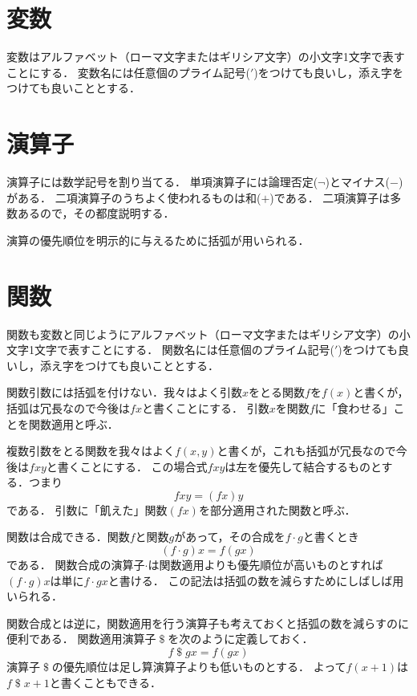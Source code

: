 \documentclass[twocolumn]{jsbook}
\newcommand{\dollar}{\mathop{\$}}
\begin{document}
\section{変数}

変数はアルファベット（ローマ文字またはギリシア文字）の小文字1文字で表すことにする．
変数名には任意個のプライム記号($'$)をつけても良いし，添え字をつけても良いこととする．

\section{演算子}

演算子には数学記号を割り当てる．
単項演算子には論理否定($\neg$)とマイナス($-$)がある．
二項演算子のうちよく使われるものは和($+$)である．
二項演算子は多数あるので，その都度説明する．

演算の優先順位を明示的に与えるために括弧が用いられる．

\section{関数}

関数も変数と同じようにアルファベット（ローマ文字またはギリシア文字）の小文字1文字で表すことにする．
関数名には任意個のプライム記号($'$)をつけても良いし，添え字をつけても良いこととする．

関数引数には括弧を付けない．我々はよく引数$x$をとる関数$f$を$f(x)$と書くが，括弧は冗長なので今後は$fx$と書くことにする．
引数$x$を関数$f$に「食わせる」ことを関数適用と呼ぶ．

複数引数をとる関数を我々はよく$f(x,y)$と書くが，これも括弧が冗長なので今後は$fxy$と書くことにする．
この場合式$fxy$は左を優先して結合するものとする．つまり$$fxy=(fx)y$$である．
引数に「飢えた」関数$(fx)$を部分適用された関数と呼ぶ．

関数は合成できる．関数$f$と関数$g$があって，その合成を$f\cdot g$と書くとき$$(f\cdot g)x=f(gx)$$である．
関数合成の演算子$\cdot$は関数適用よりも優先順位が高いものとすれば$(f\cdot g)x$は単に$f\cdot gx$と書ける．
この記法は括弧の数を減らすためにしばしば用いられる．

関数合成とは逆に，関数適用を行う演算子も考えておくと括弧の数を減らすのに便利である．
関数適用演算子$\dollar$を次のように定義しておく．
\begin{equation}
f\dollar gx=f(gx)
\end{equation}
演算子$\dollar$の優先順位は足し算演算子よりも低いものとする．
よって$f(x+1)$は$f\dollar x+1$と書くこともできる．
\end{document}
